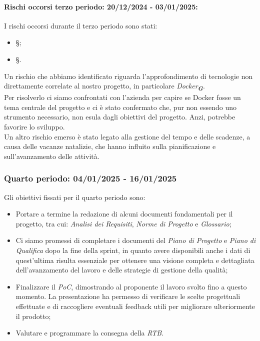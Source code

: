 \paragraph{Rischi occorsi terzo periodo: 20/12/2024 - 03/01/2025: }
I rischi occorsi durante il terzo periodo sono stati:
\begin{itemize}
    \item \S{};
    \item \S{}.
\end{itemize}
Un rischio che abbiamo identificato riguarda l'approfondimento di tecnologie non direttamente correlate al nostro progetto, in particolare {\emph{Docker}}\textsubscript{\textit{\textbf{G}}}.\\
Per risolverlo ci siamo confrontati con l'azienda per capire se Docker fosse un tema centrale del progetto e ci è stato confermato che, pur non essendo uno strumento necessario, non esula dagli obiettivi del progetto. Anzi, potrebbe favorire lo sviluppo.\\
Un altro rischio emerso è stato legato alla gestione del tempo e delle scadenze, a causa delle vacanze natalizie, che hanno influito sulla pianificazione e sull’avanzamento delle attività.

\newpage
\subsubsection{Quarto periodo: 04/01/2025 - 16/01/2025}  
\label{sec:prev_cons_quarto_periodo}  

Gli obiettivi fissati per il quarto periodo sono:  
\begin{itemize} 
    \item Portare a termine la redazione di alcuni documenti fondamentali per il progetto, tra cui: \emph{Analisi dei Requisiti}, \emph{Norme di Progetto} e \emph{Glossario};
    \item Ci siamo promessi di completare i documenti del \emph{Piano di Progetto} e \emph{Piano di Qualifica} dopo la fine della sprint, in quanto avere disponibili anche i dati di quest'ultima risulta essenziale per ottenere una visione completa e dettagliata dell'avanzamento del lavoro e delle strategie di gestione della qualità;  
    \item Finalizzare il \emph{PoC}, dimostrando al proponente il lavoro svolto fino a questo momento. La presentazione ha permesso di verificare le scelte progettuali effettuate e di raccogliere eventuali feedback utili per migliorare ulteriormente il prodotto;
    \item Valutare e programmare la consegna della \emph{RTB}.
\end{itemize} 

